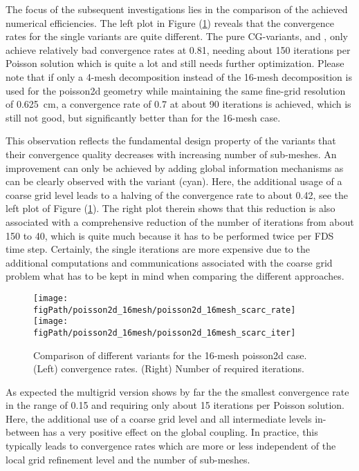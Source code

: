 The focus of the subsequent investigations lies in the comparison of the achieved numerical efficiencies. 
The left plot in Figure (\ref{FIG_scarc_pi_twoD_scarc_convergence}) reveals that the convergence rates for the single \scarc{} variants
are quite different. The pure CG-variants, \uscarc{} and \scarcdefault{}, only achieve relatively bad convergence rates at 0.81, needing about 150 \scarc{} iterations per Poisson solution which is quite a lot and still needs further optimization.
Please note that if only a 4-mesh decomposition instead of the 16-mesh decomposition is used for the {\ct poisson2d} geometry while maintaining the same fine-grid resolution of 0.625~cm, a convergence rate of 0.7 at about 90 \scarc{} iterations is achieved,
which is still not good, but significantly better than for the 16-mesh case.

This observation reflects the fundamental design property of the \ols{} variants that their convergence quality decreases with increasing number of sub-meshes. An improvement can only be achieved by adding global information mechanisms as can be clearly observed with the \scarctwolevel{} variant (cyan). Here, the additional usage of a coarse grid level leads to a halving of the convergence rate to about 0.42, see the left plot of Figure (\ref{FIG_scarc_pi_twoD_scarc_convergence}). The right plot therein shows that this reduction is also associated with a comprehensive  reduction of the number of \scarc{} iterations from about 150 to 40, which is quite much because it has to be performed twice per FDS time step.  
Certainly, the single iterations are more expensive due to the additional computations and communications associated with the coarse grid problem what has to be kept in mind when comparing the different approaches.

\begin{figure}[ht]
\begin{center}
\texttt{[image: \\figPath/poisson2d\_16mesh/poisson2d\_16mesh\_scarc\_rate]}
\texttt{[image: \\figPath/poisson2d\_16mesh/poisson2d\_16mesh\_scarc\_iter]}
\end{center}
\caption[Comparison of the different \scarc{} variants] {Comparison of different \scarc{} variants for the 16-mesh {\ct poisson2d} case. (Left) \scarc{} convergence rates.  (Right) Number of required \scarc{} iterations. }
\label{FIG_scarc_pi_twoD_scarc_convergence}
\end{figure}


As expected the multigrid version shows by far the the smallest convergence rate in the range of 0.15 and requiring only about 15 \scarc{} iterations per Poisson solution. 
Here, the additional use of a coarse grid level and all intermediate levels in-between has a very positive effect on the global coupling. In practice, this typically leads to convergence rates which are more or less independent of the local grid refinement level and the number of sub-meshes.


